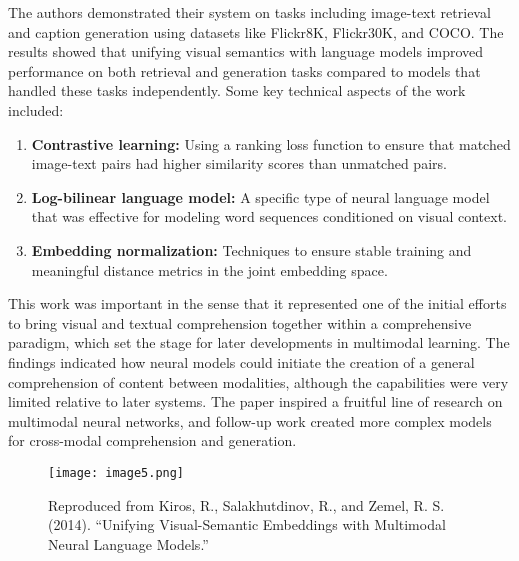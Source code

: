 \documentclass[conference]{IEEEtran}
\begin{document}
\begin{enumerate}
\begin{enumerate}
\end{enumerate}
The authors demonstrated their system on tasks including image-text retrieval and caption generation using datasets like Flickr8K, Flickr30K, and COCO. The results showed that unifying visual semantics with language models improved performance on both retrieval and generation tasks compared to models that handled these tasks independently.
Some key technical aspects of the work included:
\begin{enumerate}
\item \textbf{Contrastive learning:} Using a ranking loss function to ensure that matched image-text pairs had higher similarity scores than unmatched pairs.
\item \textbf{Log-bilinear language model:} A specific type of neural language model that was effective for modeling word sequences conditioned on visual context.
\item \textbf{Embedding normalization:} Techniques to ensure stable training and meaningful distance metrics in the joint embedding space.
\end{enumerate}
This work was important in the sense that it represented one of the initial efforts to bring visual and textual comprehension together within a comprehensive paradigm, which set the stage for later developments in multimodal learning. The findings indicated how neural models could initiate the creation of a general comprehension of content between modalities, although the capabilities were very limited relative to later systems. The paper inspired a fruitful line of research on multimodal neural networks, and follow-up work created more complex models for cross-modal comprehension and generation.

\begin{figure}
    \centering
    \texttt{[image: image5.png]}
    \caption{Reproduced from Kiros, R., Salakhutdinov, R., and Zemel, R. S. (2014). “Unifying Visual-Semantic Embeddings with Multimodal Neural Language Models.”}
    \label{fig:enter-label}
\end{figure}


\end{enumerate}
\end{document}
